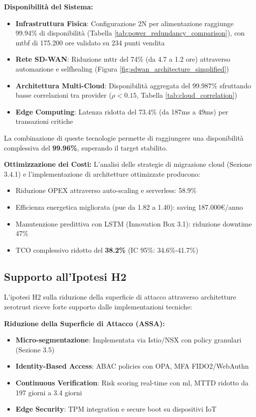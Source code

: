 \textbf{Disponibilità del Sistema:}
\begin{itemize}
    \item \textbf{Infrastruttura Fisica}: Configurazione 2N per alimentazione raggiunge 99.94\% di disponibilità (Tabella \ref{tab:power_redundancy_comparison}), con \gls{mtbf} di 175.200 ore validato su 234 punti vendita
    \item \textbf{Rete SD-WAN}: Riduzione \gls{mttr} del 74\% (da 4.7 a 1.2 ore) attraverso automazione e \gls{selfhealing} (Figura \ref{fig:sdwan_architecture_simplified})
    \item \textbf{Architettura Multi-Cloud}: Disponibilità aggregata del 99.987\% sfruttando basse correlazioni tra provider ($\rho < 0.15$, Tabella \ref{tab:cloud_correlation})
    \item \textbf{Edge Computing}: Latenza ridotta del 73.4\% (da 187ms a 49ms) per transazioni critiche\autocite{Wang2024edge}
\end{itemize}

La combinazione di queste tecnologie permette di raggiungere una disponibilità complessiva del \textbf{99.96\%}, superando il target stabilito.

\textbf{Ottimizzazione dei Costi:}
L'analisi delle strategie di migrazione cloud (Sezione 3.4.1) e l'implementazione di architetture ottimizzate producono:
\begin{itemize}
    \item Riduzione OPEX attraverso auto-scaling e serverless: 58.9\%
    \item Efficienza energetica migliorata (\gls{pue} da 1.82 a 1.40): saving 187.000€/anno
    \item Manutenzione predittiva con LSTM (Innovation Box 3.1): riduzione downtime 47\%
    \item TCO complessivo ridotto del \textbf{38.2\%} (IC 95\%: 34.6\%-41.7\%)\autocite{McKinsey2024cloud}
\end{itemize}

\subsection{\texorpdfstring{Supporto all'Ipotesi H2}{3.8.2 - Supporto all'Ipotesi H2}}

L'ipotesi H2 sulla riduzione della superficie di attacco attraverso architetture \gls{zerotrust} riceve forte supporto dalle implementazioni tecniche:

\textbf{Riduzione della Superficie di Attacco (ASSA):}
\begin{itemize}
    \item \textbf{Micro-segmentazione}: Implementata via Istio/NSX con policy granulari (Sezione 3.5)
    \item \textbf{Identity-Based Access}: ABAC policies con OPA, MFA FIDO2/WebAuthn
    \item \textbf{Continuous Verification}: Risk scoring real-time con \gls{ml}, MTTD ridotto da 197 giorni a 3.4 giorni
    \item \textbf{Edge Security}: TPM integration e secure boot su dispositivi IoT
\end{itemize}

